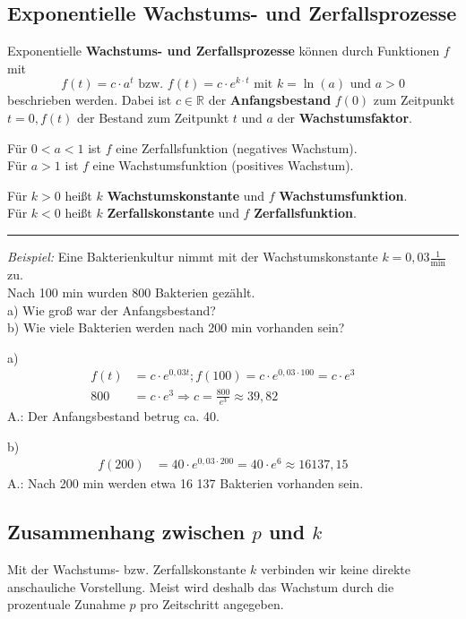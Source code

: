 \subsection{Exponentielle Wachstums- und Zerfallsprozesse}
\begin{definition}
    Exponentielle \textbf{Wachstums- und Zerfallsprozesse} können durch Funktionen $f$ mit $$f(t) = c \cdot a^t \text{ bzw. } f(t) = c \cdot e^{k \cdot t} \text{ mit } k = \ln{(a)} \text{ und } a > 0$$ beschrieben werden. Dabei ist $c \in \mathbb{R}$ der \textbf{Anfangsbestand} $f(0)$ zum Zeitpunkt $t = 0, f(t)$ der Bestand zum Zeitpunkt $t$ und $a$ der \textbf{Wachstumsfaktor}.
    
    Für $0 < a <1$ ist $f$ eine Zerfallsfunktion (negatives Wachstum).\\
    Für $a > 1$ ist $f$ eine Wachstumsfunktion (positives Wachstum). 

    Für $k > 0$ heißt $k$ \textbf{Wachstumskonstante} und $f$ \textbf{Wachstumsfunktion}. \\
    Für $k < 0$ heißt $k$ \textbf{Zerfallskonstante} und $f$ \textbf{Zerfallsfunktion}.
\end{definition}
\noindent\rule{\textwidth}{1pt}
\textit{Beispiel:} Eine Bakterienkultur nimmt mit der Wachstumskonstante $k = 0,03\frac{1}{\text{min}}$ zu. \\
Nach 100 min wurden 800 Bakterien gezählt.\\
a) Wie groß war der Anfangsbestand?\\
b) Wie viele Bakterien werden nach 200 min vorhanden sein?

a) 
\begin{align*}
    f(t) & = c \cdot e^{0,03t}; f(100) = c \cdot e^{0,03 \cdot 100} = c \cdot e^3 && \\
    800 & = c \cdot e^3 \Rightarrow c = \frac{800}{e^3} \approx 39,82 &&
\end{align*}
A.: Der Anfangsbestand betrug ca. 40.

b) \begin{align*}
    f(200) & = 40 \cdot e^{0,03 \cdot 200} = 40 \cdot e^6 \approx 16 137,15 &&
\end{align*}
A.: Nach 200 min werden etwa 16 137 Bakterien vorhanden sein. 
\subsection{Zusammenhang zwischen $p$ und $k$}
Mit der Wachstums- bzw. Zerfallskonstante $k$ verbinden wir keine direkte anschauliche Vorstellung. Meist wird deshalb das Wachstum durch die prozentuale Zunahme $p$ pro Zeitschritt angegeben. \\

